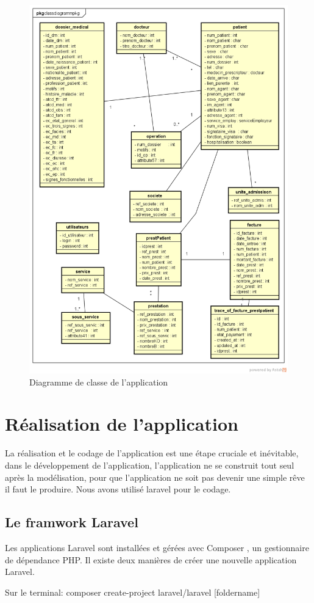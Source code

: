 	  \begin{figure}[h]
	  	  \includegraphics[scale=0.75]{Chapitre2/images/classDiagramme}
	  \caption{Diagramme de classe de l'application}
	  	  \end{figure}
	  
	  
	  \chapter{Réalisation de l'application}
	  
	  
	  La réalisation et le codage de l'application est une étape cruciale et inévitable,  dans le développement de l'application, l'application ne se construit tout seul après la modélisation, pour que l'application ne soit pas devenir une simple rêve il faut le produire.
	  \medskip
	  Nous avons utilisé laravel pour le codage.
	  
	  
	  \section{Le framwork Laravel}
	  
	  Les applications Laravel sont installées et gérées avec Composer , un gestionnaire de
	  dépendance PHP. Il existe deux manières de créer une nouvelle application Laravel.
	  
	 Sur le terminal:
	  composer create-project laravel/laravel [foldername]
	  
	  
	  
	  